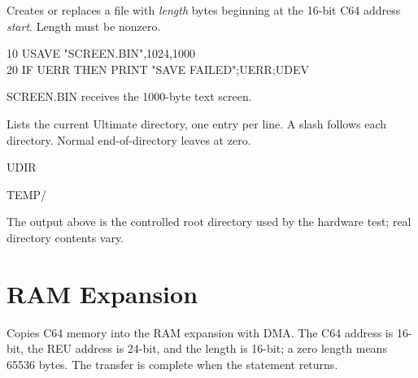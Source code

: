 \begin{referencechapter}


Creates or replaces a file with \textit{length} bytes beginning at the 16-bit
C64 address \textit{start}. Length must be nonzero.

\begin{screen}
10 USAVE "SCREEN.BIN",1024,1000\\
20 IF UERR THEN PRINT "SAVE FAILED";UERR;UDEV
\end{screen}

\begin{resultbox}
SCREEN.BIN receives the 1000-byte text screen.
\end{resultbox}




Lists the current Ultimate directory, one entry per line. A slash follows each
directory. Normal end-of-directory leaves  at zero.

\begin{screen}
UDIR
\end{screen}

\begin{outputbox}
TEMP/
\end{outputbox}

The output above is the controlled root directory used by the hardware test;
real directory contents vary.

\section{RAM Expansion}




Copies C64 memory into the RAM expansion with DMA. The C64 address is 16-bit,
the REU address is 24-bit, and the length is 16-bit; a zero length means 65536
bytes. The transfer is complete when the statement returns.


\end{referencechapter}
